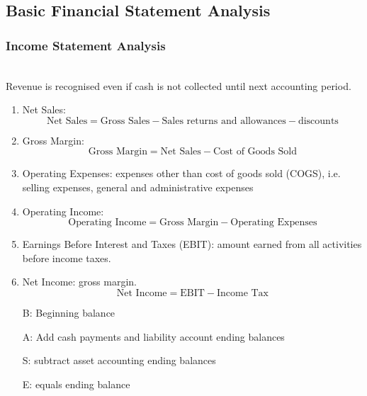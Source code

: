 \subsection{Basic Financial Statement Analysis}

\subsubsection{Income Statement Analysis}

\begin{remark} \\
Revenue is recognised even if cash is not collected until next accounting period.
\end{remark}

\begin{definition} 
\begin{enumerate}[label=\roman*.]
\setlength{\itemsep}{0pt}
\item Net Sales: 
\begin{equation}
\text{Net Sales} = \text{Gross Sales} - \text{Sales returns and allowances} - \text{discounts} \nonumber
\end{equation}
\item Gross Margin: 
\begin{equation}
\text{Gross Margin} = \text{Net Sales} - \text{Cost of Goods Sold} \nonumber
\end{equation}
\item Operating Expenses: expenses other than cost of goods sold (COGS), i.e. selling expenses, general and administrative expenses
\item Operating Income: 
\begin{equation}
\text{Operating Income} = \text{Gross Margin} - \text{Operating Expenses} \nonumber
\end{equation}
\item Earnings Before Interest and Taxes (EBIT): amount earned from all activities before income taxes.
\item Net Income: gross margin.
\begin{equation}
\text{Net Income} = \text{EBIT} - \text{Income Tax} \nonumber
\end{equation}
\end{enumerate}
\end{definition}

\begin{method} 
\begin{enumerate}[label=\roman*.]
\setlength{\itemsep}{0pt}
\item[B:] Beginning balance
\item[A:] Add cash payments and liability account ending balances
\item[S:] subtract asset accounting ending balances
\item[E:] equals ending balance
\end{enumerate}
\end{method}

